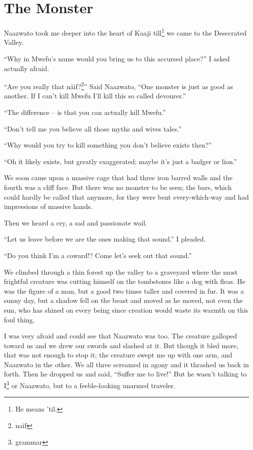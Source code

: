 \chapter{The Monster}
Naazwato took me deeper into the heart of Kaaji till\footnote{He means 'til.} we came to the Desecrated Valley.

``Why in Mwefu's name would you bring us to this accursed place?'' I asked actually afraid.

``Are you really that n{\"a}if?\footnote{na{\"i}f}'' Said Naazwato, ``One monster is just as good as another. If I can't kill Mwefu I'll kill this so called devourer.''

``The difference -- is that you can actually kill Mwefu.''

``Don't tell me you believe all those myths and wives tales.''

``Why would you try to kill something you don't believe exists then?''

``Oh it likely exists, but greatly exaggerated; maybe it's just a badger or lion.''

We soon came upon a massive cage that had three iron barred walls and the fourth was a cliff face. But there was no monster to be seen; the bars, which could hardly be called that anymore, for they were bent every-which-way and had impressions of massive hands.

Then we heard a cry, a sad and passionate wail.

``Let us leave before we are the ones making that sound.'' I pleaded.

``Do you think I'm a coward!? Come let's seek out that sound.''

We climbed through a thin forest up the valley to a graveyard where the most frightful creature was cutting himself on the tombstones like a dog with fleas.
He was the figure of a man, but a good two times taller and covered in fur.
It was a sunny day, but a shadow fell on the beast and moved as he moved, not even the sun, who has shined on every being since creation would waste its warmth on this foul thing.

I was very afraid and could see that Naazwato was too. The creature galloped toward us and we drew our swords and slashed at it. But though it bled more, that was not enough to stop it; the creature swept me up with one arm, and Naazwato in the other. We all three screamed in agony and it thrashed us back in forth.
Then he dropped us and said, ``Suffer me to live!'' But he wasn't talking to I\footnote{grammar} or Naazwato, but to a feeble-looking unarmed traveler.

